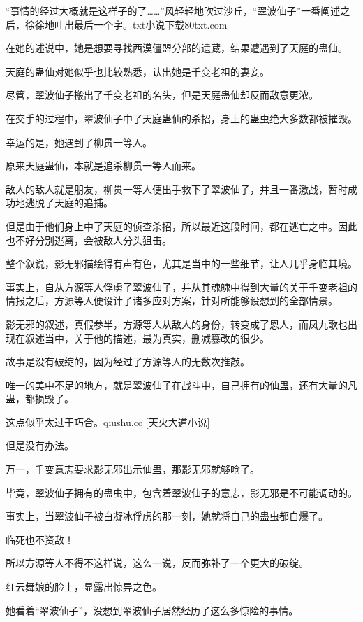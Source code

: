 
\begin{this_body}

“事情的经过大概就是这样子的了……”风轻轻地吹过沙丘，“翠波仙子”一番阐述之后，徐徐地吐出最后一个字。txt小说下载80txt.com

在她的述说中，她是想要寻找西漠僵盟分部的遗藏，结果遭遇到了天庭的蛊仙。

天庭的蛊仙对她似乎也比较熟悉，认出她是千变老祖的妻妾。

尽管，翠波仙子搬出了千变老祖的名头，但是天庭蛊仙却反而敌意更浓。

在交手的过程中，翠波仙子中了天庭蛊仙的杀招，身上的蛊虫绝大多数都被摧毁。

幸运的是，她遇到了柳贯一等人。

原来天庭蛊仙，本就是追杀柳贯一等人而来。

敌人的敌人就是朋友，柳贯一等人便出手救下了翠波仙子，并且一番激战，暂时成功地逃脱了天庭的追捕。

但是由于他们身上中了天庭的侦查杀招，所以最近这段时间，都在逃亡之中。因此也不好分别逃离，会被敌人分头狙击。

整个叙说，影无邪描绘得有声有色，尤其是当中的一些细节，让人几乎身临其境。

事实上，自从方源等人俘虏了翠波仙子，并从其魂魄中得到大量的关于千变老祖的情报之后，方源等人便设计了诸多应对方案，针对所能够设想到的全部情景。

影无邪的叙述，真假参半，方源等人从敌人的身份，转变成了恩人，而凤九歌也出现在叙述当中，关于他的描述，最为真实，删减篡改的很少。

故事是没有破绽的，因为经过了方源等人的无数次推敲。

唯一的美中不足的地方，就是翠波仙子在战斗中，自己拥有的仙蛊，还有大量的凡蛊，都损毁了。

这点似乎太过于巧合。qiushu.cc [天火大道小说]

但是没有办法。

万一，千变意志要求影无邪出示仙蛊，那影无邪就够呛了。

毕竟，翠波仙子拥有的蛊虫中，包含着翠波仙子的意志，影无邪是不可能调动的。

事实上，当翠波仙子被白凝冰俘虏的那一刻，她就将自己的蛊虫都自爆了。

临死也不资敌！

所以方源等人不得不这样说，这么一说，反而弥补了一个更大的破绽。

红云舞娘的脸上，显露出惊异之色。

她看着“翠波仙子”，没想到翠波仙子居然经历了这么多惊险的事情。


\end{this_body}
